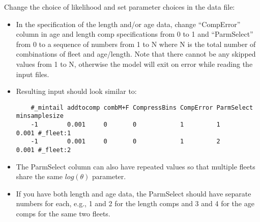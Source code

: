 Change the choice of likelihood and set parameter choices in the data
file: 
\begin{itemize}
	\item In the specification of the length and/or age data, change
	``CompError'' column in age and length comp specifications from 0 to 1 and
	``ParmSelect'' from 0 to a sequence of numbers from 1 to N where N is the
	total number of combinations of fleet and age/length. Note that there
	cannot be any skipped values from 1 to N, otherwise the model will exit
	on error while reading the input files. 	
	\item Resulting input should look similar to:
	\begin{small}
	\begin{verbatim}
	#_mintail addtocomp combM+F CompressBins CompError ParmSelect minsamplesize   
	-1        0.001     0       0            1         1          0.001 #_fleet:1
	-1        0.001     0       0            1         2          0.001 #_fleet:2
	\end{verbatim}
	\end{small}
	\item The ParmSelect column can also have repeated values so that
	multiple fleets share the same $log(\theta)$ parameter. 	
	\item If you have both length and age data, the ParmSelect should have
	separate numbers for each, e.g., 1 and 2 for the length comps and 3 and 4
	for the age comps for the same two fleets. 	
\end{itemize}


